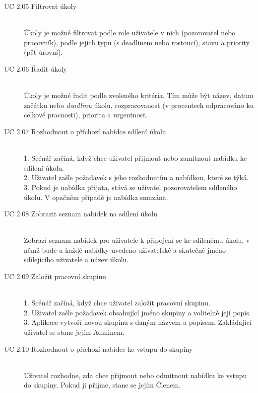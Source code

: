 \documentclass[thesis=B,czech]{FITthesis}[2012/06/26]
\begin{document}
\begin{description}
				\item[UC 2.05 Filtrovat úkoly] \hfill \\
					Úkoly je možné filtrovat podle role uživatele v nich (pozorovatel nebo pracovník), podle jejich typu (s deadlinem nebo rostoucí), stavu a priority (pět úrovní).
					
				\item[UC 2.06 Řadit úkoly] \hfill \\
					Úkoly je možné řadit podle zvoleného kritéria. Tím může být název, datum začátku nebo \textit{deadlinu} úkolu, rozpracovanost (v procentech odpracováno ku celkové pracnosti), priorita a urgentnost.
				
				\item[UC 2.07 Rozhodnout o příchozí nabídce sdílení úkolu] \hfill \\
					1. Scénář začíná, když chce uživatel přijmout nebo zamítnout nabídku ke sdílení úkolu. \\
					2. Uživatel zašle požadavek s jeho rozhodnutím a nabídkou, které se týká. \\
					3. Pokud je nabídka přijata, stává se uživatel pozorovatelem sdíleného úkolu. V opačném případě je nabídka smazána. \\
				
				\item[UC 2.08 Zobrazit seznam nabídek na sdílení úkolu] \hfill \\
					Zobrazí seznam nabídek pro uživatele k připojení se ke sdílenému úkolu, v němž bude u každé nabídky uvedeno uživatelské a skutečné jméno sdílejícího uživatele a název úkolu.
				
				\item[UC 2.09 Založit pracovní skupinu] \hfill \\
					1. Scénář začíná, když chce uživatel založit pracovní skupinu. \\
					2. Uživatel zašle požadavek obsahující jméno skupiny a volitelně její popis. \\
					3. Aplikace vytvoří novou skupinu s daným názvem a popisem. Zakládající uživatel se stane jejím Adminem. \\
					
				\item[UC 2.10 Rozhodnout o příchozí nabídce ke vstupu do skupiny] \hfill \\
					Uživatel rozhodne, zda chce přijmout nebo odmítnout nabídku ke vstupu do skupiny. Pokud ji přijme, stane se jejím Členem.
					

\end{description}
\end{document}
